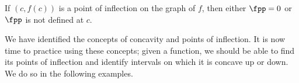 {If $(c,f(c))$ is a point of inflection on the graph of $f$, then either $\fpp=0$ or $\fpp$ is not defined at $c$.}

%
%
%
%
%
%
%
%

We have identified the concepts of concavity and points of inflection. It is now time to practice using these concepts; given a function, we should be able to find its points of inflection and identify intervals on which it is concave up or down. We do so in the following examples.\\



